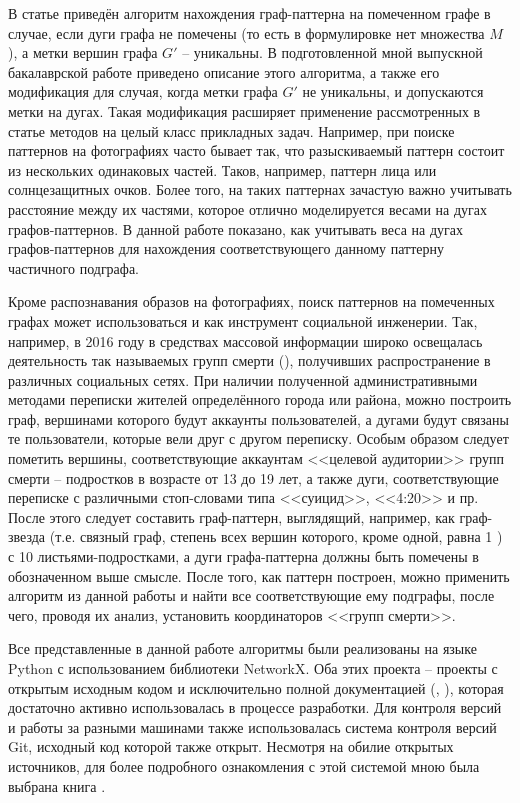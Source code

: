 В статье \cite{patmat} приведён алгоритм нахождения граф-паттерна на помеченном графе в случае, если дуги графа не помечены (то есть в формулировке нет множества $M$), а метки вершин графа $G'$ -- уникальны. В подготовленной мной выпускной бакалаврской работе приведено описание этого алгоритма, а также его модификация для случая, когда метки графа $G'$ не уникальны, и допускаются метки на дугах. Такая модификация расширяет применение рассмотренных в статье \cite{patmat} методов на целый класс прикладных задач. Например, при поиске паттернов на фотографиях часто бывает так, что разыскиваемый паттерн состоит из нескольких одинаковых частей. Таков, например, паттерн лица или солнцезащитных очков. Более того, на таких паттернах зачастую важно учитывать расстояние между их частями, которое отлично моделируется весами на дугах графов-паттернов. В данной работе показано, как учитывать веса на дугах графов-паттернов для нахождения соответствующего данному паттерну частичного подграфа.

Кроме распознавания образов на фотографиях, поиск паттернов на помеченных графах может использоваться и как инструмент социальной инженерии. Так, например, в 2016 году в средствах массовой информации широко освещалась деятельность так называемых групп смерти (\cite{sinkit}), получивших распространение в различных социальных сетях. При наличии полученной административными методами переписки жителей определённого города или района, можно построить граф, вершинами которого будут аккаунты пользователей, а дугами будут связаны те пользователи, которые вели друг с другом переписку. Особым образом следует пометить вершины, соответствующие аккаунтам <<целевой аудитории>> групп смерти -- подростков в возрасте от 13 до 19 лет, а также дуги, соответствующие переписке с различными стоп-словами типа <<суицид>>, <<4:20>> и пр. После этого следует составить граф-паттерн, выглядящий, например, как граф-звезда (т.е. связный граф, степень всех вершин которого, кроме одной, равна 1 \cite{stargraph}) с 10 листьями-подростками, а дуги графа-паттерна должны быть помечены в обозначенном выше смысле. После того, как паттерн построен, можно применить алгоритм из данной работы и найти все соответствующие ему подграфы, после чего, проводя их анализ, установить координаторов <<групп смерти>>.

Все представленные в данной работе алгоритмы были реализованы на языке Python с использованием библиотеки NetworkX. Оба этих проекта -- проекты с открытым исходным кодом и исключительно полной документацией (\cite{pythdoc}, \cite{networkx}), которая достаточно активно использовалась в процессе разработки. Для контроля версий и работы за разными машинами также использовалась система контроля версий Git, исходный код которой также открыт. Несмотря на обилие открытых источников, для более подробного ознакомления с этой системой мною была выбрана книга \cite{gitbook}.